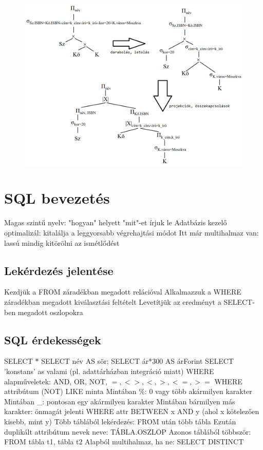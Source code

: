 \documentclass[12pt,a4paper]{article}
\begin{document}
\begin{figure}[h!]
	\centering
	\includegraphics[width=0.9\linewidth]{relalg-optimize-short}
\end{figure}

\pagebreak

\section{SQL bevezetés}

\begin{outline}
	\1 Magas szintű nyelv: "hogyan" helyett "mit"-et írjuk le
	\1 Adatbázis kezelő optimalizál: kitalálja a leggyorsabb végrehajtási módot
	\1 Itt már multihalmaz van: lassú mindig kitörölni az ismétlődést
\end{outline}

\subsection{Lekérdezés jelentése}

\begin{outline}
	\1 Kezdjük a FROM záradékban megadott relációval
	\1 Alkalmazzuk a WHERE záradékban megadott kiválasztási feltételt
	\1 Levetítjük az eredményt a SELECT-ben megadott oszlopokra
\end{outline}

\subsection{SQL érdekességek}

\begin{outline}
	\1 SELECT *
	\1 SELECT név AS sör; SELECT ár*300 AS árForint
	\1 SELECT 'konstans' as valami (pl. adattárházban integráció miatt)
	\1 WHERE alapműveletek: AND, OR, NOT, $=,<>,<,>,<=,>=$
	\1 WHERE attribútum (NOT) LIKE minta
		\2 Mintában \%: 0 vagy több akármilyen karakter
		\2 Mintában \_: pontosan egy akármilyen karakter
		\2 Mintában bármilyen más karakter: önmagát jelenti
	\1 WHERE attr BETWEEN x AND y (ahol x kötelezően kisebb, mint y)
	\1 Több táblából lekérdezés: FROM után több tábla
		\2 Ezután duplikált attribútum nevek neve: TÁBLA.OSZLOP
	\1 Azonos táblából többször: FROM tábla t1, tábla t2
	\1 Alapból multihalmaz, ha ne: SELECT DISTINCT
\end{outline}
\end{document}
